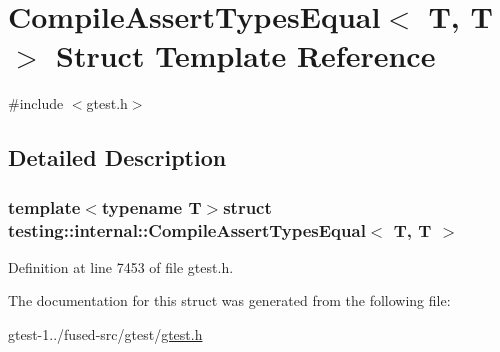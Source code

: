 \hypertarget{structtesting_1_1internal_1_1CompileAssertTypesEqual_3_01T_00_01T_01_4}{\section{\-Compile\-Assert\-Types\-Equal$<$ \-T, \-T $>$ \-Struct \-Template \-Reference}
\label{d8/db2/structtesting_1_1internal_1_1CompileAssertTypesEqual_3_01T_00_01T_01_4}
}


{\ttfamily \#include $<$gtest.\-h$>$}



\subsection{\-Detailed \-Description}
\subsubsection*{template$<$typename T$>$struct testing\-::internal\-::\-Compile\-Assert\-Types\-Equal$<$ T, T $>$}



\-Definition at line 7453 of file gtest.\-h.



\-The documentation for this struct was generated from the following file\-:\begin{DoxyCompactItemize}
\item 
gtest-\/1../fused-\/src/gtest/\hyperlink{fused-src_2gtest_2gtest_8h}{gtest.\-h}\end{DoxyCompactItemize}
